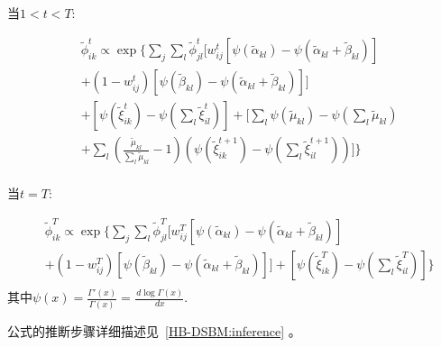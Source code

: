 当\textbf{$1<t<T$}:

\begin{equation}
\label{eq9}
\begin{split}
&\widetilde{\phi}_{ik}^t \propto \exp \{ \sum_j \sum_l \widetilde{\phi}_{jl}^t [w_{ij}^t[\psi(\widetilde{\alpha}_{kl}) - \psi(\widetilde{\alpha}_{kl}+\widetilde{\beta}_{kl})]\\
&+ (1-w_{ij}^t)[\psi(\widetilde{\beta}_{kl})-\psi(\widetilde{\alpha}_{kl}+\widetilde{\beta}_{kl})]]    \\
& + [\psi(\widetilde{\xi}_{ik}^t) - \psi(\sum_l \widetilde{\xi}_{il}^t)]+ [\sum_l \psi(\widetilde{\mu}_{kl}) - \psi(\sum_l \widetilde{\mu}_{kl}) \\
&+\sum_l (\frac{\widetilde{\mu}_{kl}}{\sum_l \widetilde{\mu}_{kl}} -1)(\psi(\widetilde{\xi}_{ik}^{t+1}) - \psi(\sum_l \widetilde{\xi}_{il}^{t+1}))]  \}\\
\end{split}
\end{equation} 

当\textbf{$t=T$}:

\begin{equation}
\label{eq10}
\begin{split}
&\widetilde{\phi}_{ik}^T \propto \exp \{ \sum_j \sum_l \widetilde{\phi}_{jl}^T [w_{ij}^T[\psi(\widetilde{\alpha}_{kl}) - \psi(\widetilde{\alpha}_{kl}+\widetilde{\beta}_{kl})]  \\
&+(1-w_{ij}^T)[\psi(\widetilde{\beta}_{kl})-\psi(\widetilde{\alpha}_{kl}+\widetilde{\beta}_{kl})]]  + [\psi(\widetilde{\xi}_{ik}^T) - \psi(\sum_l \widetilde{\xi}_{il}^T)]\}  \\
\end{split}
\end{equation} 
其中$\psi(x) = \frac{\Gamma'(x)}{\Gamma(x)} = \frac{\,d \log \Gamma(x)}{\, dx}$.

公式的推断步骤详细描述见~\ref{HB-DSBM:inference} 。




